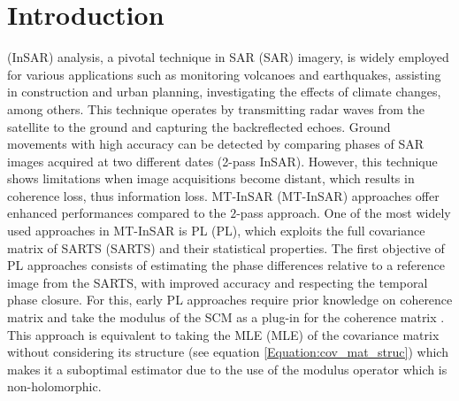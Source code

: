 \section{Introduction}
     (\acs{InSAR}) analysis, a pivotal technique in 
    \acl{SAR} (\acs{SAR}) imagery, is widely employed for various applications such as  monitoring volcanoes and earthquakes, assisting in construction and urban planning, investigating the effects of climate changes, among others. This technique operates by transmitting  radar waves from the satellite to the ground and capturing the backreflected echoes. Ground movements with high accuracy can be detected by comparing phases of \acs{SAR} images acquired at two different dates (2-pass \acs{InSAR}). However, this technique shows limitations when image acquisitions become distant, which results in coherence loss, thus information loss. %
    \acl{MT-InSAR} (\acs{MT-InSAR}) approaches offer enhanced performances compared to the $2$-pass approach. One of the most widely used approaches in \acs{MT-InSAR} is %
    \acl{PL} (\acs{PL}), which exploits the full covariance matrix of 
    \acl{SARTS} (\acs{SARTS}) and their statistical properties. %
    The first objective of \acs{PL} approaches consists of estimating the phase differences relative to a reference image from the \acs{SARTS}, with improved accuracy and respecting the temporal phase closure. For this, early PL approaches require prior knowledge on coherence matrix and take the modulus of the \ac{SCM} as a plug-in for the coherence matrix \citep{guarnieri2008exploitation}. This approach is equivalent to taking the 
    \acl{MLE} (\ac{MLE}) of the covariance matrix without considering its structure (see equation \eqref{Equation:cov_mat_struc}) which makes it a suboptimal estimator due to the use of the modulus operator which is non-holomorphic. 
